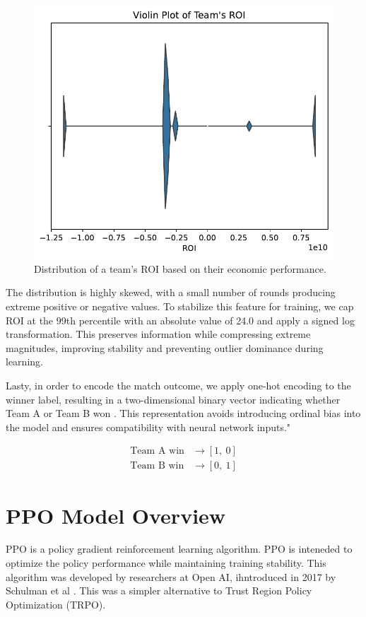 \documentclass[sigconf]{acmart}
\begin{document}
\begin{figure}[ht]
  \centering
  \includegraphics[width=0.9\linewidth]{roi_violin.pdf}
  \caption{Distribution of a team's ROI based on their economic performance.}
  \label{fig:round_duration_dist}
\end{figure}

\smallskip

The distribution is highly skewed, with a small number of rounds producing extreme positive or negative values. To stabilize this feature for training, we cap ROI at the 99th percentile with an absolute value of 24.0 and apply a signed log transformation. This preserves information while compressing extreme magnitudes, improving stability and preventing outlier dominance during learning.

Lasty, in order to encode the match outcome, we apply one-hot encoding to the winner label, resulting in a two-dimensional binary vector indicating whether Team A or Team B won \cite{datacamp_onehot_2023}. This representation avoids introducing ordinal bias into the model and ensures compatibility with neural network inputs."

\begin{align*}
\text{Team A win} &\rightarrow [1,\ 0] \\
\text{Team B win} &\rightarrow [0,\ 1]
\end{align*}

\section{PPO Model Overview}
PPO is a policy gradient reinforcement learning algorithm. PPO is inteneded to optimize the policy performance while maintaining training stability. This algorithm was developed by researchers at Open AI, ihntroduced in 2017 by Schulman et al \cite{schulman2017proximalpolicyoptimizationalgorithms}. This was a simpler alternative to Trust Region Policy Optimization (TRPO).
\end{document}
